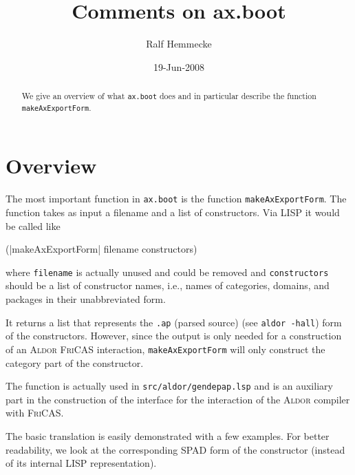 \documentclass{article}
\newcommand{\file}[1]{\texttt{#1}}
\newcommand{\xAldor}{\textsc{Aldor}}
\newcommand{\xFriCAS}{\textsc{FriCAS}}
\begin{document}
\title{Comments on ax.boot}
\author{Ralf Hemmecke}
\date{19-Jun-2008}
\maketitle
\begin{abstract}
  We give an overview of what \file{ax.boot} does and in particular
  describe the function \verb'makeAxExportForm'.
\end{abstract}
\tableofcontents

\section{Overview}
The most important function in \file{ax.boot} is the function
\verb'makeAxExportForm'.
%
The function takes as input a filename and a list of constructors.
Via LISP it would be called like
\begin{code}
(|makeAxExportForm| filename constructors)
\end{code}
where \verb'filename' is actually unused and could be removed and
\verb'constructors' should be a list of constructor names, i.e., names
of categories, domains, and packages in their unabbreviated form.

It returns a list that represents the \texttt{.ap} (parsed source)
(see \verb'aldor -hall') form of the constructors. However, since the
output is only needed for a construction of an \xAldor{} \xFriCAS{}
interaction, \verb'makeAxExportForm' will only construct the category
part of the constructor.

The function is actually used in \file{src/aldor/gendepap.lsp} and is an
auxiliary part in the construction of the interface for the
interaction of the \xAldor{} compiler with \xFriCAS{}.



The basic translation is easily demonstrated with a few examples. For
better readability, we look at the corresponding SPAD form of the
constructor (instead of its internal LISP representation).
\end{document}
